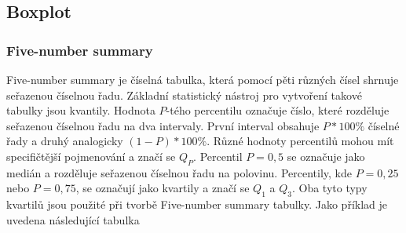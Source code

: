 

\subsection{Boxplot}
\subsubsection{Five-number summary}
Five-number summary je číselná tabulka, která pomocí pěti různých čísel shrnuje seřazenou číselnou řadu. Základní statistický nástroj pro
vytvoření takové tabulky jsou kvantily. Hodnota $P$-tého percentilu označuje číslo, které rozděluje seřazenou číselnou řadu na dva intervaly. 
První interval obsahuje $P*100\%$ číselné řady a druhý analogicky $(1-P)*100\%$. Různé hodnoty percentilů mohou mít specifičtější pojmenování a značí se $Q_P$.
Percentil $P = 0,5$ se označuje jako medián a rozděluje seřazenou číselnou řadu na polovinu. Percentily, kde $P = 0,25$ nebo $P = 0,75$, se označují
jako kvartily a značí se $Q_{1}$ a $Q_{3}$. Oba tyto typy kvartilů jsou použité při tvorbě Five-number summary tabulky. Jako příklad je
uvedena následující tabulka

